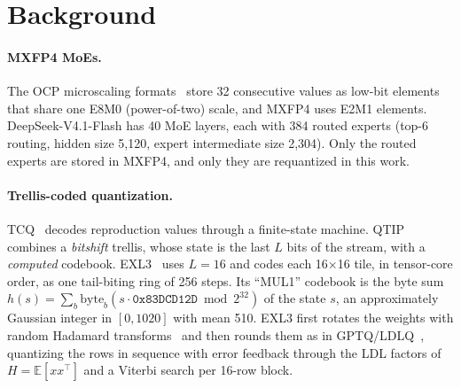 \section{Background}
\label{sec:background}

\paragraph{MXFP4 MoEs.} The OCP microscaling formats~\citep{rouhani2023mx} store 32 consecutive values as low-bit
elements that share one E8M0 (power-of-two) scale, and MXFP4 uses E2M1 elements. DeepSeek-V4.1-Flash has 40 MoE
layers, each with 384 routed experts (top-6 routing, hidden size 5,120, expert intermediate size 2,304). Only the
routed experts are stored in MXFP4, and only they are requantized in this work.

\paragraph{Trellis-coded quantization.} TCQ~\citep{marcellin1990tcq} decodes reproduction values through a
finite-state machine. QTIP~\citep{tseng2024qtip} combines a \emph{bitshift} trellis, whose state is the last $L$ bits
of the stream, with a \emph{computed} codebook. EXL3~\citep{exllamav3} uses $L=16$ and codes each 16$\times$16 tile,
in tensor-core order, as one tail-biting ring of 256 steps. Its ``MUL1'' codebook is the byte sum
$h(s)=\sum_b\mathrm{byte}_b(s\cdot\texttt{0x83DCD12D}\bmod 2^{32})$ of the state $s$, an approximately Gaussian
integer in $[0,1020]$ with mean 510. EXL3 first rotates the weights with random Hadamard
transforms~\citep{chee2023quip,tseng2024quipsharp} and then rounds them as in
GPTQ/LDLQ~\citep{frantar2023gptq,chee2023quip}, quantizing the rows in sequence with error feedback through the LDL
factors of $H=\mathbb{E}[xx^\top]$ and a Viterbi search per 16-row block.
